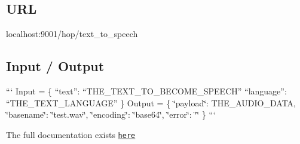 \subsection*{U\-R\-L}

{\ttfamily localhost\-:9001/hop/text\-\_\-to\-\_\-speech}

\subsection*{Input / Output}

``` Input = \{ “text”\-: “\-T\-H\-E\-\_\-\-T\-E\-X\-T\-\_\-\-T\-O\-\_\-\-B\-E\-C\-O\-M\-E\-\_\-\-S\-P\-E\-E\-C\-H” “language”\-: “\-T\-H\-E\-\_\-\-T\-E\-X\-T\-\_\-\-L\-A\-N\-G\-U\-A\-G\-E” \} {\ttfamily  } Output = \{ \char`\"{}payload\char`\"{}\-: T\-H\-E\-\_\-\-A\-U\-D\-I\-O\-\_\-\-D\-A\-T\-A, \char`\"{}basename\char`\"{}\-: \char`\"{}test.\-wav\char`\"{}, \char`\"{}encoding\char`\"{}\-: \char`\"{}base64\char`\"{}, \char`\"{}error\char`\"{}\-: \char`\"{}\char`\"{} \} ```

The full documentation exists \href{http://github.com/rapp-project/rapp-platform/tree/master/rapp_web_services/services#text-to-speech}{\tt here} 